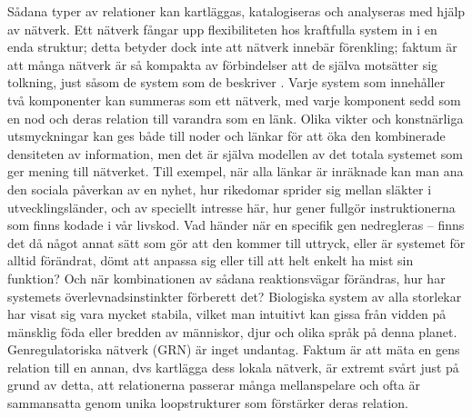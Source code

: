 Sådana typer av relationer kan kartläggas, katalogiseras och analyseras med hjälp av nätverk. Ett nätverk fångar upp flexibiliteten hos kraftfulla system in i en enda struktur; detta betyder dock inte att nätverk innebär förenkling; faktum är att många nätverk är så kompakta av förbindelser att de själva motsätter sig tolkning, just såsom de system som de beskriver \citep{dianati2016unwinding}. Varje system som innehåller två komponenter kan summeras som ett nätverk, med varje komponent sedd som en nod och deras relation till varandra som en länk. Olika vikter och konstnärliga utsmyckningar kan ges både till noder och länkar för att öka den kombinerade densiteten av information, men det är själva modellen av det totala systemet som ger mening till nätverket. Till exempel, när alla länkar är inräknade kan man ana den sociala påverkan av en nyhet, hur rikedomar sprider sig mellan släkter i utvecklingsländer, och av speciellt intresse här, hur gener fullgör instruktionerna som finns kodade i vår livskod. Vad händer när en specifik gen nedregleras – finns det då något annat sätt som gör att den kommer till uttryck, eller är systemet för alltid förändrat, dömt att anpassa sig eller till att helt enkelt ha mist sin funktion? Och när kombinationen av sådana reaktionsvägar förändras, hur har systemets överlevnadsinstinkter förberett det? Biologiska system av alla storlekar har visat sig vara mycket stabila, vilket man intuitivt kan gissa från vidden på mänsklig föda eller bredden av människor, djur och olika språk på denna planet. Genregulatoriska nätverk (GRN) är inget undantag. Faktum är att mäta en gens relation till en annan, dvs kartlägga dess lokala nätverk, är extremt svårt just på grund av detta, att relationerna passerar många mellanspelare och ofta är sammansatta genom unika loopstrukturer som förstärker deras relation. 


